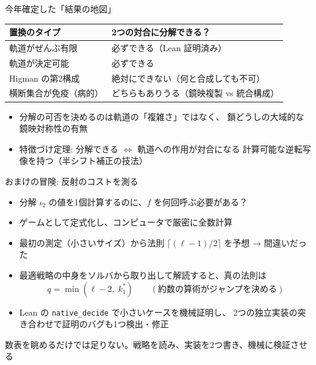 \documentclass[aspectratio=169,11pt]{beamer}
\begin{document}
\begin{frame}{今年確定した「結果の地図」}
  \begin{center}
  \begin{tabular}{ll}
    \toprule
    置換のタイプ & 2つの対合に分解できる？ \\
    \midrule
    軌道がぜんぶ有限 & \alert{必ずできる}（Lean 証明済み） \\
    軌道が決定可能 & \alert{必ずできる} \\
    Higman の第2構成 & \alert{絶対にできない}（何と合成しても不可） \\
    横断集合が免疫（病的） & \alert{どちらもありうる}（鏡映複製 vs 統合構成） \\
    \bottomrule
  \end{tabular}
  \end{center}
  \vspace{0.5em}
  \begin{itemize}
    \item 分解の可否を決めるのは軌道の「複雑さ」ではなく、
      鎖どうしの\alert{大域的な鏡映対称性}の有無
    \item 特徴づけ定理: 分解できる \(\iff\) 軌道への作用が対合になる
      計算可能な逆転写像を持つ（半シフト補正の技法）
  \end{itemize}
\end{frame}

\begin{frame}{おまけの冒険: 反射のコストを測る}
  \begin{itemize}
    \item 分解 \(\iota_2\) の値を1個計算するのに、\(f\) を何回呼ぶ必要がある？
    \item ゲームとして定式化し、コンピュータで\alert{厳密に全数計算}
    \item 最初の測定（小さいサイズ）から法則 \(\lceil(\ell-1)/2\rceil\) を予想
      → \alert{間違いだった}
    \item 最適戦略の中身をソルバから取り出して解読すると、真の法則は
      \[ q = \min(\ell - 2,\; k_1^{*})\qquad(\text{約数の算術がジャンプを決める}) \]
    \item Lean の \texttt{native\_decide} で小さいケースを機械証明し、
      2つの独立実装の突き合わせで証明のバグも1つ検出・修正
  \end{itemize}
  \begin{center}
    \small 数表を眺めるだけでは足りない。戦略を読み、実装を2つ書き、機械に検証させる
  \end{center}
\end{frame}
\end{document}
